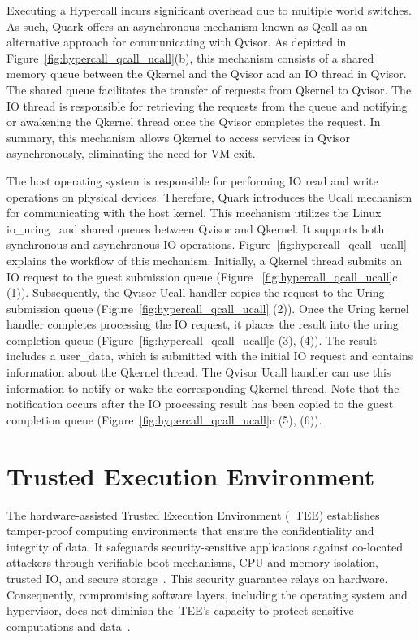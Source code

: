 Executing a Hypercall incurs significant overhead due to multiple world switches. As such, Quark offers an asynchronous mechanism known as Qcall as an alternative approach for communicating with Qvisor. As depicted in Figure~\ref{fig:hypercall_qcall_ucall}(b), this mechanism consists of a 
shared memory queue between the Qkernel and the Qvisor and an IO thread in Qvisor. The shared queue facilitates the transfer of requests from Qkernel to Qvisor. The IO thread is responsible for retrieving the requests from the queue and notifying or awakening the Qkernel thread once the Qvisor completes the request. In summary,   
this mechanism allows Qkernel to access services in Qvisor asynchronously, eliminating the need for VM exit. 

The host operating system is responsible for performing IO read and write operations on physical devices. Therefore, Quark introduces the Ucall mechanism for communicating with the host kernel. This mechanism utilizes the Linux io\_uring~\cite*{io_uring} and shared queues between Qvisor and Qkernel. It supports
both synchronous and asynchronous IO operations. Figure~\ref{fig:hypercall_qcall_ucall} explains the workflow of this mechanism. Initially, a Qkernel thread submits an IO request to the guest submission queue (Figure ~\ref{fig:hypercall_qcall_ucall}c (1)). Subsequently, the Qvisor Ucall handler copies the request to the Uring submission queue 
(Figure~\ref{fig:hypercall_qcall_ucall} (2)). Once the Uring kernel handler completes processing the IO request, it places the result into the uring completion queue (Figure~\ref{fig:hypercall_qcall_ucall}c (3), (4)). The result includes a user\_data, which is submitted with the initial IO 
request and contains information about the Qkernel thread. The Qvisor Ucall handler can use this information to notify or wake the corresponding Qkernel thread. Note that the notification occurs after the IO processing result has been copied to the guest completion 
queue (Figure~\ref{fig:hypercall_qcall_ucall}c (5), (6)).

\section{Trusted Execution Environment}

The hardware-assisted Trusted Execution Environment (~\acrshort{TEE}) establishes tamper-proof computing environments that ensure the confidentiality and integrity of data. It safeguards security-sensitive applications against co-located attackers through verifiable boot mechanisms, 
CPU and memory isolation, trusted IO, and secure storage~\cite*{Hardware-supported-TEE}. This security guarantee relays on hardware. Consequently, compromising software layers, including the operating system and hypervisor, does not diminish the~\acrshort{TEE}'s capacity to protect sensitive 
computations and data~\cite*{7345265}.


